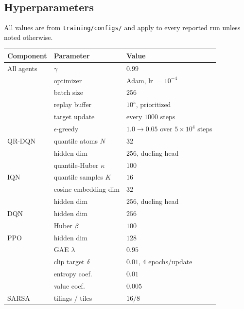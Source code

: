\documentclass[10pt,twocolumn]{article}
\begin{document}
\subsection{Hyperparameters}
\label{sec:appendix-hparams}
All values are from \texttt{training/configs/} and apply to every reported run unless noted otherwise.

\begin{table}[t]
\centering\footnotesize
\begin{tabular}{lll}
\toprule
Component & Parameter & Value \\
\midrule
All agents    & $\gamma$                     & $0.99$ \\
              & optimizer                     & Adam, lr $=10^{-4}$ \\
              & batch size                    & $256$ \\
              & replay buffer                 & $10^5$, prioritized \\
              & target update                 & every $1000$ steps \\
              & $\epsilon$-greedy             & $1.0\to0.05$ over $5\times10^4$ steps \\
QR-DQN        & quantile atoms $N$             & $32$ \\
              & hidden dim                    & $256$, dueling head \\
              & quantile-Huber $\kappa$        & $100$ \\
IQN           & quantile samples $K$           & $16$ \\
              & cosine embedding dim           & $32$ \\
              & hidden dim                     & $256$, dueling head \\
DQN           & hidden dim                     & $256$ \\
              & Huber $\beta$                  & $100$ \\
PPO           & hidden dim                     & $128$ \\
              & GAE $\lambda$                  & $0.95$ \\
              & clip target $\delta$           & $0.01$, $4$ epochs/update \\
              & entropy coef.\                 & $0.01$ \\
              & value coef.\                   & $0.005$ \\
SARSA         & tilings / tiles                & $16 / 8$ \\

\end{tabular}
\end{table}
\end{document}
